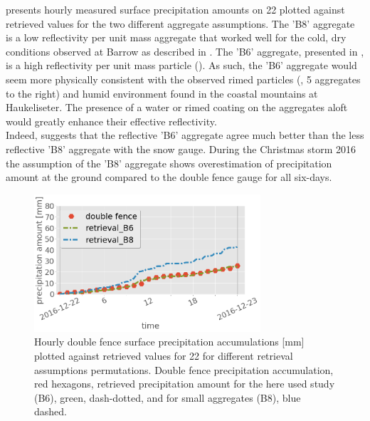  presents hourly measured surface precipitation amounts on \SI{22}{\dec} plotted against retrieved values for the two different aggregate assumptions. The 'B8' aggregate is a low reflectivity per unit mass aggregate that worked well for the cold, dry conditions observed at Barrow as described in \citet{cooper_variational_2017}. The 'B6' aggregate, presented in , is a high reflectivity per unit mass particle ().  As such, the 'B6' aggregate would seem more physically consistent with the observed rimed particles (, 5 aggregates to the right) and humid environment found in the coastal mountains at Haukeliseter.  The presence of a water or rimed coating on the aggregates aloft would greatly enhance their effective reflectivity. 
\\
Indeed,  suggests that the reflective 'B6' aggregate agree much better than the less reflective 'B8' aggregate with the snow gauge. During the Christmas storm 2016 the assumption of the 'B8' aggregate shows overestimation of precipitation amount at the ground compared to the double fence gauge for all six-days.
%
\\
\begin{figure}[t!]
	\centering
	\includegraphics[width=0.75\textwidth]{./fig_obs_ret/20161222_2}
	\caption{Hourly double fence surface precipitation accumulations [mm] plotted against retrieved values for \SI{22}{\dec} for different retrieval assumptions permutations. Double fence precipitation accumulation, red hexagons, retrieved precipitation amount for the here used study (B6), green, dash-dotted, and for small aggregates (B8), blue dashed.}\label{fig:ret_sensitivity}
\end{figure}
